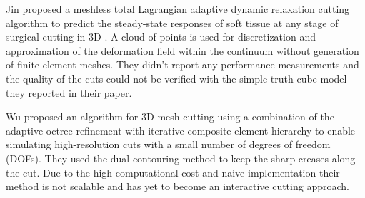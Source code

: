 Jin \etal proposed a meshless total Lagrangian adaptive dynamic relaxation cutting algorithm to predict the steady-state 
responses of soft tissue at any stage of surgical cutting in 3D \cite{Jin2013}. A cloud of points is used for discretization
and approximation of the deformation field within the continuum without generation of finite element meshes. They didn't report 
any performance measurements and the quality of the cuts could not be verified with the simple truth cube model they reported in their paper.


Wu \etal \cite{Wu2011} proposed an algorithm for 3D mesh cutting using a combination of the adaptive octree refinement with iterative composite
element hierarchy to enable simulating high-resolution cuts with a small number of degrees of freedom (DOFs). 
They used the dual contouring method \cite{Ju2002} to keep the sharp creases along the cut. Due to the high computational cost and naive implementation 
their method is not scalable and has yet to become an interactive cutting approach.




